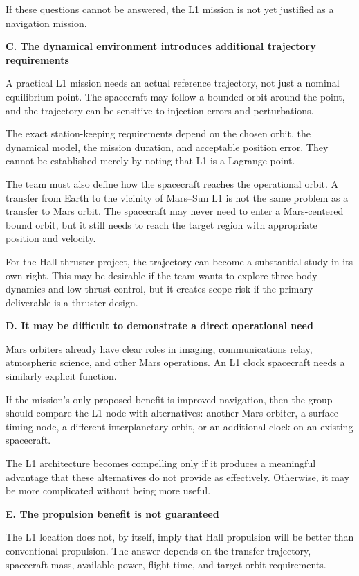 If these questions cannot be answered, the L1 mission is not
yet justified as a navigation mission.

\textbf{C. The dynamical environment introduces additional
	trajectory requirements}

A practical L1 mission needs an actual reference trajectory,
not just a nominal equilibrium point. The spacecraft may follow
a bounded orbit around the point, and the trajectory can be
sensitive to injection errors and perturbations.

The exact station-keeping requirements depend on the chosen
orbit, the dynamical model, the mission duration, and acceptable
position error. They cannot be established merely by noting
that L1 is a Lagrange point.

The team must also define how the spacecraft reaches the
operational orbit. A transfer from Earth to the vicinity of
Mars--Sun L1 is not the same problem as a transfer to Mars
orbit. The spacecraft may never need to enter a Mars-centered
bound orbit, but it still needs to reach the target region
with appropriate position and velocity.

For the Hall-thruster project, the trajectory can become a
substantial study in its own right. This may be desirable
if the team wants to explore three-body dynamics and low-thrust
control, but it creates scope risk if the primary deliverable
is a thruster design.

\textbf{D. It may be difficult to demonstrate a direct
	operational need}

Mars orbiters already have clear roles in imaging, communications
relay, atmospheric science, and other Mars operations. An L1
clock spacecraft needs a similarly explicit function.

If the mission's only proposed benefit is improved navigation,
then the group should compare the L1 node with alternatives:
another Mars orbiter, a surface timing node, a different
interplanetary orbit, or an additional clock on an existing
spacecraft.

The L1 architecture becomes compelling only if it produces
a meaningful advantage that these alternatives do not provide
as effectively. Otherwise, it may be more complicated without
being more useful.

\textbf{E. The propulsion benefit is not guaranteed}

The L1 location does not, by itself, imply that Hall propulsion
will be better than conventional propulsion. The answer depends
on the transfer trajectory, spacecraft mass, available power,
flight time, and target-orbit requirements.

